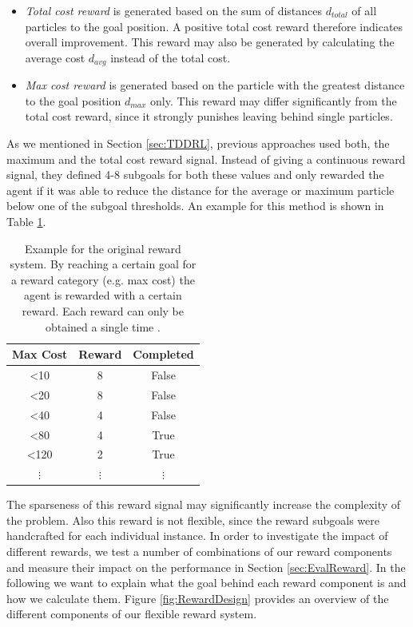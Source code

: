\begin{itemize}
    \item \textit{Total cost reward} is generated based on the sum of distances $d_{total}$ of all particles to the goal position. A positive total cost reward therefore indicates overall improvement. This reward may also be generated by calculating the average cost $d_{avg}$ instead of the total cost.
    \item \textit{Max cost reward} is generated based on the particle with the greatest distance to the goal position $d_{max}$ only. This reward may differ significantly from the total cost reward, since it strongly punishes leaving behind single particles. 
\end{itemize}

As we mentioned in Section \ref{sec:TDDRL}, previous approaches used both, the maximum and the total cost reward signal. Instead of giving a continuous reward signal, they defined 4-8 subgoals for both these values and only rewarded the agent if it was able to reduce the distance for the average or maximum particle below one of the subgoal thresholds. An example for this method is shown in Table \ref{tab:OriginalRewards}.

\begin{table} [ht]
    \begin{center}
        \begin{tabular}{|c|c|c|}
            \hline
            Max Cost & Reward & Completed \\
            \hline
            <10 & 8 & False \\
            <20 & 8 & False \\
            <40 & 4 & False \\
            <80 & 4 & True \\
            <120 & 2 & True \\
            $\vdots$ & $\vdots$ & $\vdots$ \\
            \hline
        \end{tabular}
    \end{center}
    \caption[Original Reward Example]{Example for the original reward system. By reaching a certain goal for a reward category (e.g. max cost) the agent is rewarded with a certain reward. Each reward can only be obtained a single time \cite{huang2019}.} \label{tab:OriginalRewards}
\end{table}


The sparseness of this reward signal may significantly increase the complexity of the problem. Also this reward is not flexible, since the reward subgoals were handcrafted for each individual instance. In order to investigate the impact of different rewards, we test a number of combinations of our reward components and measure their impact on the performance in Section \ref{sec:EvalReward}. In the following we want to explain what the goal behind each reward component is and how we calculate them. Figure \ref{fig:RewardDesign} provides an overview of the different components of our flexible reward system.

